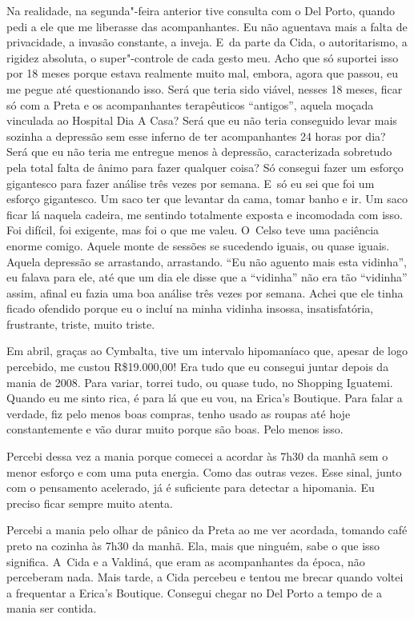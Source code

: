 Na realidade, na segunda"-feira anterior tive consulta com o Del Porto,
quando pedi a ele que me liberasse das acompanhantes. Eu não aguentava
mais a falta de privacidade, a invasão constante, a inveja. E~da parte
da Cida, o autoritarismo, a rigidez absoluta, o super"-controle de cada
gesto meu. Acho que só suportei isso por 18 meses porque estava
realmente muito mal, embora, agora que passou, eu me pegue até
questionando isso. Será que teria sido viável, nesses 18 meses, ficar só
com a Preta e os acompanhantes terapêuticos ``antigos'', aquela moçada
vinculada ao Hospital Dia A Casa? Será que eu não teria conseguido levar
mais sozinha a depressão sem esse inferno de ter acompanhantes 24 horas
por dia? Será que eu não teria me entregue menos à depressão,
caracterizada sobretudo pela total falta de ânimo para fazer qualquer
coisa? Só consegui fazer um esforço gigantesco para fazer análise três
vezes por semana. E~só eu sei que foi um esforço gigantesco. Um saco ter
que levantar da cama, tomar banho e ir. Um saco ficar lá naquela
cadeira, me sentindo totalmente exposta e incomodada com isso. Foi
difícil, foi exigente, mas foi o que me valeu. O~Celso teve uma
paciência enorme comigo. Aquele monte de sessões se sucedendo iguais, ou
quase iguais. Aquela depressão se arrastando, arrastando. ``Eu não
aguento mais esta vidinha'', eu falava para ele, até que um dia ele
disse que a ``vidinha'' não era tão ``vidinha'' assim, afinal eu fazia
uma boa análise três vezes por semana. Achei que ele tinha ficado
ofendido porque eu o incluí na minha vidinha insossa, insatisfatória,
frustrante, triste, muito triste.

Em abril, graças ao Cymbalta, tive um intervalo hipomaníaco que, apesar
de logo percebido, me custou R\$19.000,00! Era tudo que eu consegui
juntar depois da mania de 2008. Para variar, torrei tudo, ou quase tudo,
no Shopping Iguatemi. Quando eu me sinto rica, é para lá que eu vou, na
Erica's Boutique. Para falar a verdade, fiz pelo menos boas compras,
tenho usado as roupas até hoje constantemente e vão durar muito porque
são boas. Pelo menos isso.

Percebi dessa vez a mania porque comecei a acordar às 7h30 da manhã sem
o menor esforço e com uma puta energia. Como das outras vezes. Esse
sinal, junto com o pensamento acelerado, já é suficiente para detectar a
hipomania. Eu preciso ficar sempre muito atenta.

Percebi a mania pelo olhar de pânico da Preta ao me ver acordada,
tomando café preto na cozinha às 7h30 da manhã. Ela, mais que ninguém,
sabe o que isso significa. A~Cida e a Valdiná, que eram as acompanhantes
da época, não perceberam nada. Mais tarde, a Cida percebeu e tentou me
brecar quando voltei a frequentar a Erica's Boutique. Consegui chegar no
Del Porto a tempo de a mania ser contida.

